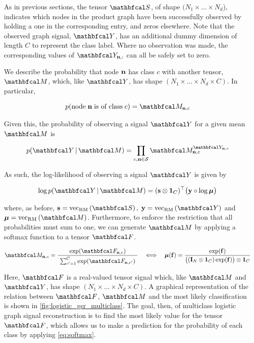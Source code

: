 As in previous sections, the tensor $\St$, of shape $(N_1 \times ... \times N_d$), indicates which nodes in the product graph have been successfully observed by holding a one in the corresponding entry, and zeros elsewhere. Note that the observed graph signal, $\Yt$, has an additional dummy dimension of length $C$ to represent the class label. Where no observation was made, the corresponding values of $\Yt_{\nn, :}$ can all be safely set to zero. 

We describe the probability that node $\mathbf{n}$ has class $c$ with another tensor, $\Mt$, which, like $\Yt$, has shape $(N_1 \times ... \times N_d \times C)$. In particular, 

\begin{equation*}
    p(\text{node} \; \nn \; \text{is of class} \; c) = \Mt_{\nn, c}
\end{equation*}

Given this, the probability of observing a signal $\Yt$ for a given mean $\Mt$ is

\begin{equation}
    p(\Yt \, | \, \Mt) = \prod_{c, \nn \in \mathcal{S}} \Mt_{\nn, c}^{\Yt_{\nn, c}}
\end{equation}

As such, the log-likelihood of observing a signal $\Yt$ is given by 

\begin{equation}
   \log p(\Yt \, | \, \Mt) = (\s \otimes \one_C)^\top \big(\y \circ \log \muu \big)
\end{equation}

where, as before, $\s = \vecrm{\St}, \; \y = \vecrm{\Yt}$ and $\muu = \vecrm{\Mt}$. Furthermore, to enforce the restriction that all probabilities must sum to one, we can generate $\Mt$ by applying a softmax function to a tensor $\Ft$. 

\begin{equation}
    \label{eq:softmax}
    \Mt_{\nn, c} = \frac{\exp(\Ft_{\nn, c})}{ \raisebox{-0.1cm} { $\sum_{c'=1}^C \exp(\Ft_{\nn, c'})$ }}  \quad \Longleftrightarrow \quad \muu(\f) = \frac{\exp(\f)}{ \big((\I_N \otimes \one_C) \exp(\f)\big) \otimes \one_C}
\end{equation}

Here, $\Ft$ is a real-valued tensor signal which, like $\Mt$ and $\Yt$, has shape $(N_1 \times ... \times N_d \times C)$. A graphical representation of the relation between $\Ft$, $\Mt$ and the most likely classification is shown in \cref{fig:logistic_gsr_multiclass}. The goal, then, of multiclass logistic graph signal reconstruction is to find the most likely value for the tensor $\Ft$, which allows us to make a prediction for the probability of each class by applying \cref{eq:softmax}.  

